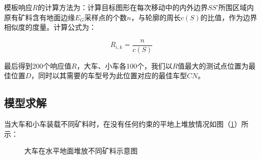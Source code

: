 \documentclass{my_paper}
\begin{document}
模板响应$R$的计算方法为：计算目标图形在每次移动中的内外边界$SS’$所围区域内原有矿料含有地面边缘$E_G$采样点的个数$n$，与轮廓的周长$c(S)$的比值，作为边界相似度的度量。计算公式为：

\begin{equation*}
    R_{i,k}=\frac{n}{c(S)}
\end{equation*}

最后得到200个响应值$R$，大车、小车各100个，我们以$R$值最大的测试点位置为最佳位置$D$，同时以其需要的车型号为此位置对应的最佳车型$CN$。

\subsection{模型求解}

当大车和小车装载不同矿料时，在没有任何约束的平地上堆放情况如图（\ref{ping_dui}）所示：

\begin{figure}[htbp]
    \centering  %
    \caption{大车在水平地面堆放不同矿料示意图}    %
    \label{ping_dui}    %
\end{figure}
\end{document}

